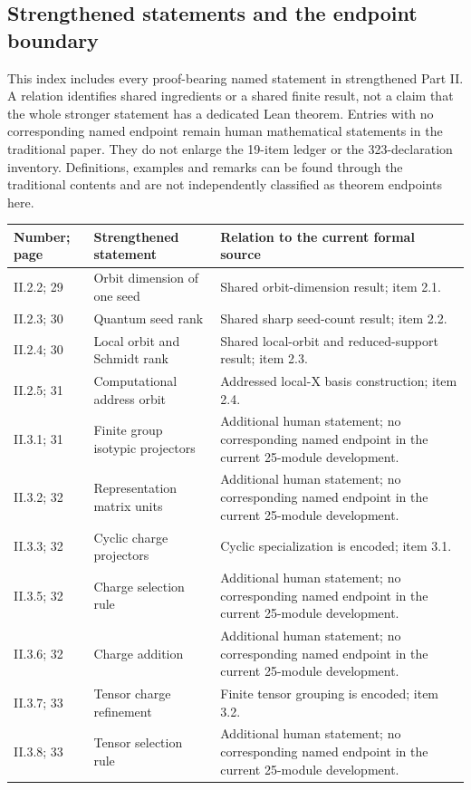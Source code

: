 \subsection{Strengthened statements and the endpoint boundary}
This index includes every proof-bearing named statement in strengthened Part II. A relation identifies shared ingredients or a shared finite result, not a claim that the whole stronger statement has a dedicated Lean theorem. Entries with no corresponding named endpoint remain human mathematical statements in the traditional paper. They do not enlarge the 19-item ledger or the 323-declaration inventory. Definitions, examples and remarks can be found through the traditional contents and are not independently classified as theorem endpoints here.

\begin{longtable}{@{}p{.13\linewidth}p{.34\linewidth}p{.46\linewidth}@{}}\toprule Number; page & Strengthened statement & Relation to the current formal source\\\midrule\endhead
II.2.2; 29 & Orbit dimension of one seed & Shared orbit-dimension result; item 2.1.\\
II.2.3; 30 & Quantum seed rank & Shared sharp seed-count result; item 2.2.\\
II.2.4; 30 & Local orbit and Schmidt rank & Shared local-orbit and reduced-support result; item 2.3.\\
II.2.5; 31 & Computational address orbit & Addressed local-X basis construction; item 2.4.\\
II.3.1; 31 & Finite group isotypic projectors & Additional human statement; no corresponding named endpoint in the current 25-module development.\\
II.3.2; 32 & Representation matrix units & Additional human statement; no corresponding named endpoint in the current 25-module development.\\
II.3.3; 32 & Cyclic charge projectors & Cyclic specialization is encoded; item 3.1.\\
II.3.5; 32 & Charge selection rule & Additional human statement; no corresponding named endpoint in the current 25-module development.\\
II.3.6; 32 & Charge addition & Additional human statement; no corresponding named endpoint in the current 25-module development.\\
II.3.7; 33 & Tensor charge refinement & Finite tensor grouping is encoded; item 3.2.\\
II.3.8; 33 & Tensor selection rule & Additional human statement; no corresponding named endpoint in the current 25-module development.\\

\end{longtable}
